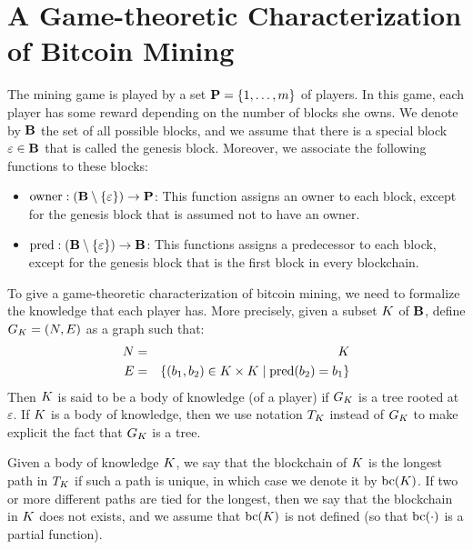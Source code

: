 \documentclass{article}
\begin{document}


\section{A Game-theoretic Characterization of Bitcoin Mining}

The mining game is played by a set $\mathbf{P} = \{1, \ldots, m\}$ of players. In this game, each player has some reward depending on the number of blocks she owns. We denote by $\mathbf{B}$ the set of all possible blocks, and we assume that there is a special block $\varepsilon \in \mathbf{B}$ that is called the genesis block. Moreover, we associate the following functions to these blocks:
\begin{itemize}
\item $\text{owner} : (\mathbf{B} \setminus \{\varepsilon\}) \to \mathbf{P}$: This function assigns an owner to each block, except for the genesis block that is assumed not to have an owner.

\item $\text{pred} : (\text{\bf B} \setminus \{\varepsilon\}) \to \text{\bf B}$: This functions assigns a predecessor to each block, except for the genesis block that is the first block in every blockchain.
\end{itemize}
To give a game-theoretic characterization of bitcoin mining, we need to formalize the knowledge that each player has. More precisely, given a subset $K$ of $\mathbf{B}$, define $G_K = (N,E)$ as a graph such that:
\begin{eqnarray*}
N &=& K\\
E &=& \{ (b_1,b_2) \in K \times K \mid \text{pred}(b_2) = b_1\}
\end{eqnarray*}
Then $K$ is said to be a body of knowledge (of a player) if $G_K$ is a tree rooted at $\varepsilon$. If $K$ is a body of knowledge, then we use notation $T_K$ instead of $G_K$ to make explicit the fact that $G_K$ is a tree.

Given a body of knowledge $K$, we say that the blockchain of $K$ is the longest path in $T_K$ if such a path is unique, in which case we denote it by $\text{bc}(K)$. If two or more different paths are tied for the longest, then we say that the blockchain in $K$ does not exists, and we assume that $\text{bc}(K)$ is not defined (so that $\text{bc}(\cdot)$ is a partial function).
\end{document}
